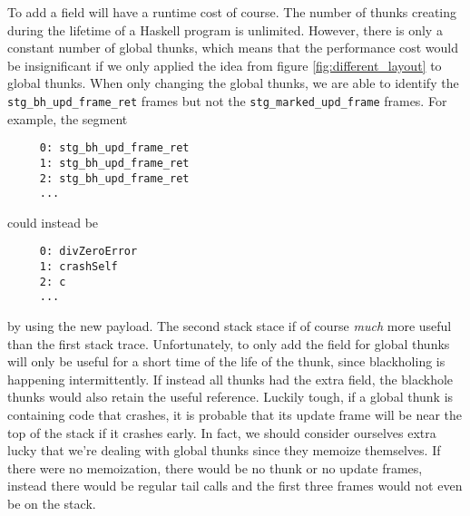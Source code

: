 \begin{figure}
\end{figure}

To add a field will have a runtime cost of course. The number of thunks
creating during the lifetime of a Haskell program is unlimited. However,
there is only a constant number of global thunks, which means that the
performance cost would be insignificant if we only applied the idea from
figure \ref{fig:different_layout} to global thunks. When
only changing the global thunks, we are able to identify
the \texttt{stg_bh_upd_frame_ret} frames but not the
\texttt{stg\_marked\_upd\_frame} frames. For example, the
segment

\begin{verbatim}
     0: stg_bh_upd_frame_ret
     1: stg_bh_upd_frame_ret
     2: stg_bh_upd_frame_ret
     ...
\end{verbatim}

could instead be

\begin{verbatim}
     0: divZeroError
     1: crashSelf
     2: c
     ...
\end{verbatim}

by using the new payload. The second stack stace if of course
\emph{much} more useful than the first stack trace. Unfortunately,
to only add the field for global thunks will only be useful for a
short time of the life of the thunk, since blackholing is happening
intermittently. If instead all thunks had the extra field, the blackhole
thunks would also retain the useful reference. Luckily tough, if a
global thunk is containing code that crashes, it is probable that its
update frame will be near the top of the stack if it crashes early. In
fact, we should consider ourselves extra lucky that we're dealing with
global thunks since they memoize themselves. If there were no memoization,
there would be no thunk or no update frames, instead there would be
regular tail calls and the first three frames would not even be on the stack.

